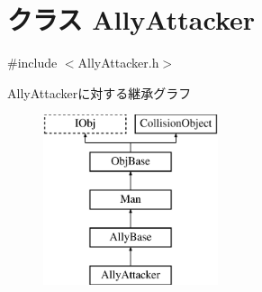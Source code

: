\hypertarget{class_ally_attacker}{\section{クラス Ally\-Attacker}
\label{class_ally_attacker}
}


{\ttfamily \#include $<$Ally\-Attacker.\-h$>$}

Ally\-Attackerに対する継承グラフ\begin{figure}[H]
\begin{center}
\leavevmode
\includegraphics[height=5.000000cm]{dd/da1/class_ally_attacker}
\end{center}
\end{figure}
